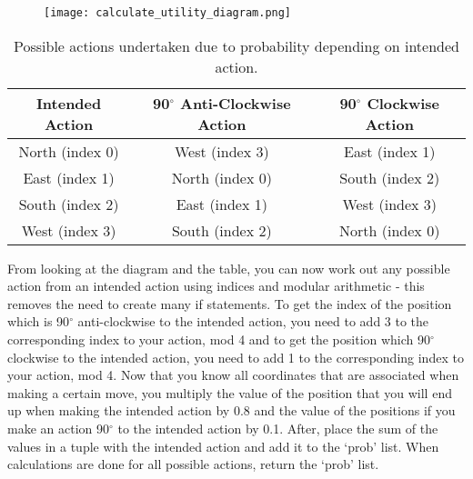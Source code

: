 \documentclass[12pt]{report}
\begin{document}
        \begin{figure}[H]
          \centering
          \texttt{[image: calculate\_utility\_diagram.png]}
        \end{figure}
        \begin{table}[H]
          \begin{center}
            \begin{tabular}{c|c|c}
              \textbf{Intended Action} & \textbf{90$^{\circ}$ Anti-Clockwise Action} & \textbf{90$^{\circ}$ Clockwise Action}\\
              \hline
              North (index 0) & West (index 3) & East (index 1)\\
              East (index 1) & North (index 0) & South (index 2)\\
              South (index 2) & East (index 1) & West (index 3)\\
              West (index 3) & South (index 2) & North (index 0)\\
            \end{tabular}
            \caption{Possible actions undertaken due to probability depending on intended action.}
            \label{tab:table1}
          \end{center}
        \end{table}
        From looking at the diagram and the table, you can now work out any possible action from an intended action using indices and modular arithmetic - this removes the need to create many if statements. To get the index of the position which is 90$^{\circ}$ anti-clockwise to the intended action, you need to add 3 to the corresponding index to your action, mod 4 and to get the position which 90$^{\circ}$ clockwise to the intended action, you need to add 1 to the corresponding index to your action, mod 4.
        \newline \newline
        Now that you know all coordinates that are associated when making a certain move, you multiply the value of the position that you will end up when making the intended action by 0.8 and the value of the positions if you make an action 90$^{\circ}$ to the intended action by 0.1. After, place the sum of the values in a tuple with the intended action and add it to the `prob' list. When calculations are done for all possible actions, return the `prob' list.
        \newline \newline
\end{document}
